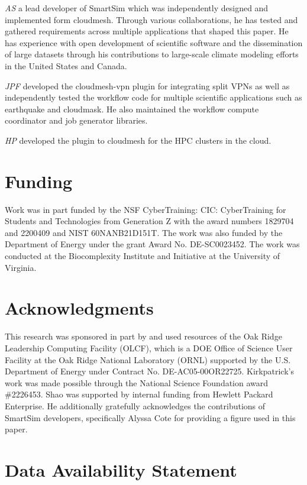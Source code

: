 \documentclass[utf8]{FrontiersinVancouver} %
\begin{document}
{\em AS} a lead developer of SmartSim which was independently designed and implemented form cloudmesh. Through various collaborations, he has tested and gathered requirements across multiple applications that shaped this paper. He has experience with open development of scientific software and the dissemination of large datasets through his contributions to large-scale climate modeling efforts in the United States and Canada. 

{\em JPF} developed the cloudmesh-vpn plugin for integrating split VPNs as well as independently tested the workflow code for multiple scientific applications such as earthquake and cloudmask. He also maintained the workflow compute coordinator and job generator libraries.

{\em HP} developed the plugin to cloudmesh for the HPC clusters in the cloud. 


\section*{Funding}

Work was in part funded by the NSF CyberTraining: CIC: CyberTraining for Students and Technologies from Generation Z with the award numbers 1829704 and 2200409 and NIST 60NANB21D151T.  The work was also funded by the Department of Energy under the grant Award No. DE-SC0023452. The work was conducted at the Biocomplexity Institute and Initiative at the University of Virginia.

\section*{Acknowledgments}

This research was sponsored in part by and used resources of the Oak Ridge Leadership Computing Facility (OLCF), which is a DOE Office of Science User Facility at the Oak Ridge National Laboratory (ORNL) supported by the U.S. Department of Energy under Contract No. DE-AC05-00OR22725. Kirkpatrick's work was made possible through the National Science Foundation award \#2226453. Shao was supported by internal funding from Hewlett Packard Enterprise. He additionally gratefully acknowledges the contributions of SmartSim developers, specifically Alyssa Cote for providing a figure used in this paper.

\section*{Data Availability Statement}
\end{document}
